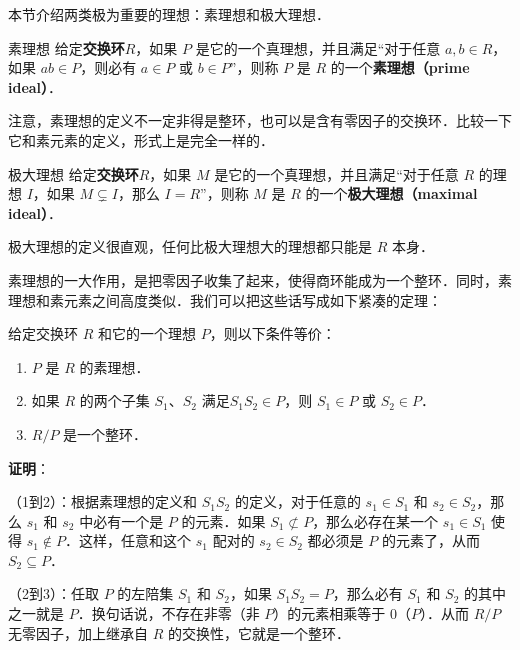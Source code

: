 

本节介绍两类极为重要的理想：素理想和极大理想．





\begin{definition}{素理想}
给定\textbf{交换环}$R$，如果 $P$ 是它的一个真理想，并且满足“对于任意 $a, b\in R$，如果 $ab\in P$，则必有 $a\in P$ 或 $b\in P$”，则称 $P$ 是 $R$ 的一个\textbf{素理想（prime ideal）}．
\end{definition}

注意，素理想的定义不一定非得是整环，也可以是含有零因子的交换环．比较一下它和素元素的定义，形式上是完全一样的．

\begin{definition}{极大理想}
给定\textbf{交换环}$R$，如果 $M$ 是它的一个真理想，并且满足“对于任意 $R$ 的理想 $I$，如果 $M\subsetneq I$，那么 $I=R$”，则称 $M$ 是 $R$ 的一个\textbf{极大理想（maximal ideal）}．
\end{definition}

极大理想的定义很直观，任何比极大理想大的理想都只能是 $R$ 本身．

素理想的一大作用，是把零因子收集了起来，使得商环能成为一个整环．同时，素理想和素元素之间高度类似．我们可以把这些话写成如下紧凑的定理：

\begin{theorem}{}\label{Ideals_the1}
给定交换环 $R$ 和它的一个理想 $P$，则以下条件等价：
\begin{enumerate}
\item $P$ 是 $R$ 的素理想．
\item 如果 $R$ 的两个子集 $S_1$、$S_2$ 满足$S_1S_2\in P$，则 $S_1\in P$ 或 $S_2\in P$．
\item $R/P$ 是一个整环．
\end{enumerate}
\end{theorem}

\textbf{证明}：

（1到2）：根据素理想的定义和 $S_1S_2$ 的定义，对于任意的 $s_1\in S_1$ 和 $s_2\in S_2$，那么 $s_1$ 和 $s_2$ 中必有一个是 $P$ 的元素．如果 $S_1\not\subset P$，那么必存在某一个 $s_1\in S_1$ 使得 $s_1\not\in P$．这样，任意和这个 $s_1$ 配对的 $s_2\in S_2$ 都必须是 $P$ 的元素了，从而 $S_2\subseteq P$．

（2到3）：任取 $P$ 的左陪集 $S_1$ 和 $S_2$，如果 $S_1S_2=P$，那么必有 $S_1$ 和 $S_2$ 的其中之一就是 $P$．换句话说，不存在非零（非 $P$）的元素相乘等于 $0$（$P$）．从而 $R/P$ 无零因子，加上继承自 $R$ 的交换性，它就是一个整环．

